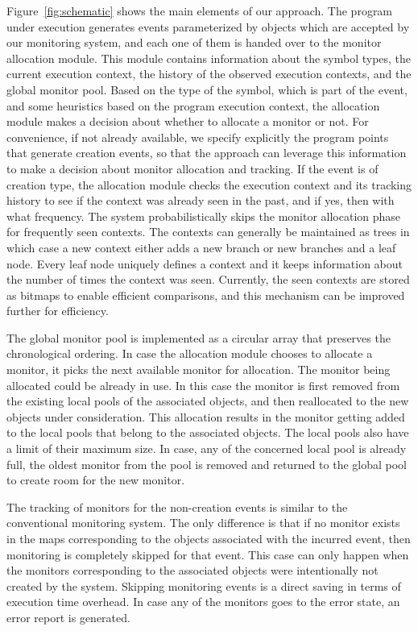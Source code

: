 Figure~\ref{fig:schematic} shows the main elements of our approach. The program 
under execution generates events parameterized by objects which are accepted by 
our monitoring system, and each one of them is handed over to the monitor 
allocation module. This module contains information about the symbol types, the current execution context, 
the history of the observed execution contexts, and the global monitor pool.
Based on the type of the symbol, which is part of the event, and some heuristics 
based on the program execution context, the allocation module makes a decision about whether to allocate a monitor or not.
For convenience, if not already available, we 
specify explicitly the program points that generate creation events, so that the 
approach can leverage this information to make a decision about monitor allocation and tracking. 
If the event is of creation type, the allocation module checks the execution context and its 
tracking history to see if the context was already seen in the past, and if yes, 
then with what frequency. The system probabilistically skips the monitor 
allocation phase for frequently seen contexts. The contexts can generally be maintained as
trees in which case a new context either adds a new branch or new branches and a leaf node. 
Every leaf node uniquely defines a context and it keeps information about the 
number of times the context was seen. Currently, the seen contexts are stored as bitmaps to enable efficient
comparisons, and this mechanism can be improved further for efficiency.

The global monitor pool is implemented as a circular array that preserves 
the chronological ordering. In case the allocation module chooses to allocate a monitor,
it picks the next available monitor for allocation. The monitor being allocated could be already in use.
In this case the monitor is first removed from the existing local pools of the associated 
objects, and then reallocated to the new objects under consideration. This allocation results in the monitor
getting added to the local pools that belong to the associated objects. The
local pools also have a limit of their maximum size.
In case, any of the concerned local pool is already full, the oldest monitor from the pool is removed and returned to the global pool
to create room for the new monitor. 

The tracking of monitors for the non-creation events is similar to the 
conventional monitoring system. The only difference is that if no monitor exists in the maps 
corresponding to the objects associated with the incurred event, then monitoring is completely 
skipped for that event. This case can only happen when the monitors corresponding to the 
associated objects were intentionally not created by the system. Skipping monitoring events is a 
direct saving in terms of execution time overhead. In case any of the monitors goes to the error state,
an error report is generated.


